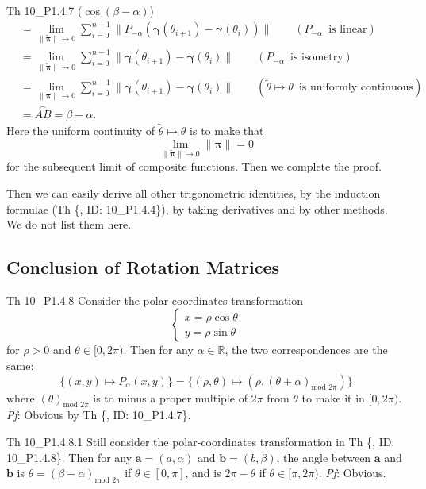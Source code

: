 \documentclass{article}
\begin{document}
\begin{Th}{Th 10\_P1.4.7 ($\cos (\beta - \alpha)$)}
$$\begin{aligned}
        &= \lim\limits_{\|\tilde{\pmb{\pi}}\|\to 0} \sum_{i=0}^{n-1} \| P_{-\alpha} \left(\pmb{\gamma}(\theta_{i+1}) - \pmb{\gamma}(\theta_i)\right)\| \qquad (P_{-\alpha} \,\text{ is linear}) \\
        &= \lim\limits_{\|\tilde{\pmb{\pi}}\|\to 0} \sum_{i=0}^{n-1} \| \pmb{\gamma}(\theta_{i+1}) - \pmb{\gamma}(\theta_i)\| \qquad (P_{-\alpha} \,\text{ is isometry}) \\
        &= \lim\limits_{\|\pmb{\pi}\|\to 0} \sum_{i=0}^{n-1} \|\pmb{\gamma}(\theta_{i+1}) - \pmb{\gamma}(\theta_i)\| \qquad (\tilde{\theta}\mapsto \theta \,\text{ is uniformly continuous}) \\
        &= \overset{\frown}{AB} = \beta - \alpha.
    \end{aligned}
    $$
    Here the uniform continuity of $\tilde{\theta}\mapsto \theta$ is to make that 
    $$ \lim\limits_{\|\tilde{\pmb{\pi}}\|\to 0} \|\pmb{\pi}\| = 0 $$
    for the subsequent limit of composite functions. Then we complete the proof.
\end{Th}

Then we can easily derive all other trigonometric identities, by the induction formulae (Th \{, ID: 10\_P1.4.4\}), by taking derivatives and by other methods. We do not list them here.

\subsection{Conclusion of Rotation Matrices}

\begin{Th}{Th 10\_P1.4.8}
    Consider the polar-coordinates transformation
    $$ \begin{cases}
        x = \rho \cos \theta \\
        y = \rho \sin \theta
    \end{cases} $$
    for $\rho>0$ and $\theta\in [0, 2\pi)$. Then for any $\alpha\in\mathbb{R}$, the two correspondences are the same:
    $$ \Big\{(x,y)\mapsto P_\alpha(x,y)\Big\} = \Big\{(\rho, \theta)\mapsto (\rho, (\theta+\alpha)_{\text{mod } 2\pi})\Big\} $$
    where $(\theta)_{\text{mod } 2\pi}$ is to minus a proper multiple of $2\pi$ from $\theta$ to make it in $[0, 2\pi)$.
    \tcblower
    \textit{Pf}: Obvious by Th \{, ID: 10\_P1.4.7\}.
\end{Th}

\begin{Th}{Th 10\_P1.4.8.1}
    Still consider the polar-coordinates transformation in Th \{, ID: 10\_P1.4.8\}. Then for any $\pmb{a} = (a, \alpha)$ and $\pmb{b} = (b, \beta)$, the angle between $\pmb{a}$ and $\pmb{b}$ is $\theta = (\beta - \alpha)_{\text{mod } 2\pi}$ if $\theta\in [0, \pi]$, and is $2\pi - \theta$ if $\theta\in [\pi, 2\pi)$.
    \tcblower
    \textit{Pf}: Obvious.
\end{Th}
\end{document}
